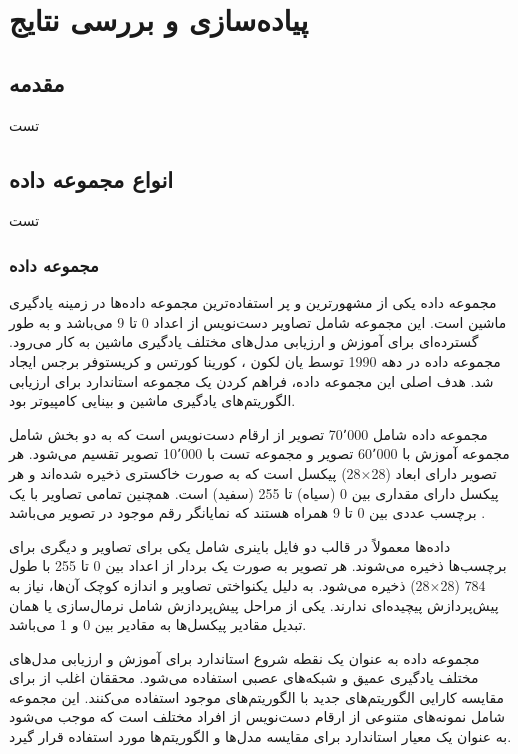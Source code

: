 \chapter{پیاده‌سازی و بررسی نتایج}

\section{مقدمه}
تست


\section{انواع مجموعه داده}
تست

\subsection{
مجموعه داده
}
مجموعه داده
یکی از مشهورترین و پر استفاده‌ترین مجموعه داده‌ها در زمینه یادگیری ماشین است. این مجموعه شامل تصاویر دست‌نویس از اعداد 0 تا 9 می‌باشد و به طور گسترده‌ای برای آموزش و ارزیابی مدل‌های مختلف یادگیری ماشین به کار می‌رود.
مجموعه داده
در دهه 1990 توسط یان لکون%
،
کورینا کورتس
و کریستوفر برجس%
 ایجاد شد. هدف اصلی این مجموعه داده، فراهم کردن یک مجموعه استاندارد برای ارزیابی الگوریتم‌های یادگیری ماشین و بینایی کامپیوتر بود.

مجموعه داده
شامل 70٬000 تصویر از ارقام دست‌نویس است که به دو بخش شامل مجموعه آموزش با 60٬000 تصویر و مجموعه تست با 10٬000 تصویر تقسیم می‌شود. هر تصویر دارای ابعاد
(28$\times$28)
پیکسل است که به صورت خاکستری%
ذخیره شده‌اند و هر پیکسل دارای مقداری بین 0 (سیاه) تا 255 (سفید) است. همچنین تمامی تصاویر با یک برچسب عددی بین 0 تا 9 همراه هستند که نمایانگر رقم موجود در تصویر می‌باشد
\cite{lecun1998gradient}.

داده‌ها معمولاً در قالب دو فایل باینری شامل یکی برای تصاویر و دیگری برای برچسب‌ها ذخیره می‌شوند. هر تصویر به صورت یک بردار از اعداد بین 0 تا 255 با طول 784
(28$\times$28)
ذخیره می‌شود. به دلیل یکنواختی تصاویر و اندازه کوچک آن‌ها، نیاز به پیش‌پردازش پیچیده‌ای ندارند. یکی از مراحل پیش‌پردازش شامل نرمال‌سازی یا همان تبدیل مقادیر پیکسل‌ها به مقادیر بین 0 و 1 می‌باشد.

مجموعه داده
به عنوان یک نقطه شروع استاندارد برای آموزش و ارزیابی مدل‌های مختلف یادگیری عمیق و شبکه‌های عصبی استفاده می‌شود. محققان اغلب از
برای مقایسه کارایی الگوریتم‌های جدید با الگوریتم‌های موجود استفاده می‌کنند. این مجموعه شامل نمونه‌های متنوعی از ارقام دست‌نویس از افراد مختلف است که موجب می‌شود به عنوان یک معیار استاندارد برای مقایسه مدل‌ها و الگوریتم‌ها مورد استفاده قرار گیرد.

